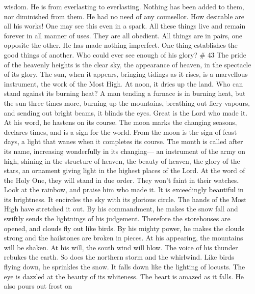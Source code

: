 wisdom. He is from everlasting to everlasting. Nothing has been added to
them, nor diminished from them. He had no need of any counsellor.
 How desirable are all his works! One may see this even in
a spark.  All these things live and remain forever in all
manner of uses. They are all obedient.  All things are in
pairs, one opposite the other. He has made nothing imperfect.
 One thing establishes the good things of another. Who
could ever see enough of his glory? \# 43  The pride of the
heavenly heights is the clear sky, the appearance of heaven, in the
spectacle of its glory.  The sun, when it appears, bringing
tidings as it rises, is a marvellous instrument, the work of the Most
High.  At noon, it dries up the land. Who can stand against
its burning heat?  A man tending a furnace is in burning
heat, but the sun three times more, burning up the mountains, breathing
out fiery vapours, and sending out bright beams, it blinds the eyes.
 Great is the Lord who made it. At his word, he hastens on
its course.  The moon marks the changing seasons, declares
times, and is a sign for the world.  From the moon is the
sign of feast days, a light that wanes when it completes its course.
 The month is called after its name, increasing wonderfully
in its changing--- an instrument of the army on high, shining in the
structure of heaven,  the beauty of heaven, the glory of the
stars, an ornament giving light in the highest places of the Lord.
 At the word of the Holy One, they will stand in due order.
They won't faint in their watches.  Look at the rainbow,
and praise him who made it. It is exceedingly beautiful in its
brightness.  It encircles the sky with its glorious circle.
The hands of the Most High have stretched it out.  By his
commandment, he makes the snow fall and swiftly sends the lightnings of
his judgement.  Therefore the storehouses are opened, and
clouds fly out like birds.  By his mighty power, he makes
the clouds strong and the hailstones are broken in pieces. 
At his appearing, the mountains will be shaken. At his will, the south
wind will blow.  The voice of his thunder rebukes the
earth. So does the northern storm and the whirlwind. Like birds flying
down, he sprinkles the snow. It falls down like the lighting of locusts.
 The eye is dazzled at the beauty of its whiteness. The
heart is amazed as it falls.  He also pours out frost on
